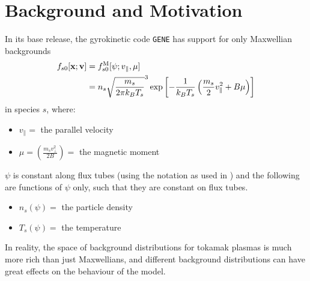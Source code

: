 \section{Background and Motivation}
    In its base release, the gyrokinetic code {\tt GENE} has support for only Maxwellian backgrounds
    \begin{align}
        f_{s0}[\mathbf{x}; \mathbf{v}]  &=  f_{s0}^{\rm M}[\psi; v_{\parallel}, \mu]  \\
        &=  n_{s}\sqrt{\frac{m_{s}}{2\pi k_{B}T_{s}}}^{3}\exp\left[- \frac{1}{k_{B}T_{s}}\left(\frac{m_{s}}{2}v_{\parallel}^{2} + B\mu\right)\right]
    \end{align}
    in species $s$, where:
    \begin{itemize}
        \item  $v_{\parallel} =$ the parallel velocity
        \item  $\mu = \left(\frac{m_{s}v_{\perp}^{2}}{2B}\right) =$ the magnetic moment
    \end{itemize}
    $\psi$ is constant along flux tubes (using the notation as used in \cite{Abe+13}) and the following are functions of $\psi$ only, such that they are constant on flux tubes.
    \begin{itemize}
        \item  $n_{s}(\psi) =$ the particle density
        \item  $T_{s}(\psi) =$ the temperature
    \end{itemize}

    In reality, the space of background distributions for tokamak plasmas is much more rich than just Maxwellians, and different background distributions can have great effects on the behaviour of the model.
    
    
    
